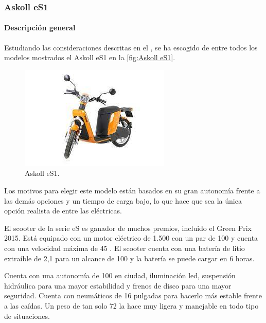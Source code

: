\subsubsection{Askoll eS1}
\label{apartado_moto_electrica}
\paragraph{Descripción general}
Estudiando las consideraciones descritas en el , se ha escogido de entre todos los modelos mostrados el Askoll eS1 en la \autoref{fig:Askoll eS1}. 

\begin{figure}[h]
    \centering
    \includegraphics[scale = 0.8]{archivos/askoll es1.jpg}
    \caption{Askoll eS1.}
    \label{fig:Askoll eS1}
\end{figure}

Los motivos para elegir este modelo están basados en su gran autonomía frente a las demás opciones y un tiempo de carga bajo, lo que hace que sea la única opción realista de entre las eléctricas.

El scooter de la serie eS es ganador de muchos premios, incluido el Green Prix 2015. Está equipado con un motor eléctrico de 1.500  con un par de 100  y cuenta con una velocidad máxima de 45 . El scooter cuenta con una batería de litio extraíble de 2,1  para un alcance de 100  y la batería se puede cargar en 6 horas.

Cuenta con una autonomía de 100  en ciudad, iluminación \gls{led}, suspensión hidráulica para una mayor estabilidad y frenos de disco para una mayor seguridad. Cuenta con neumáticos de 16 pulgadas para hacerlo más estable frente a las caídas. Un peso de tan solo 72  la hace muy ligera y manejable en todo tipo de situaciones.


